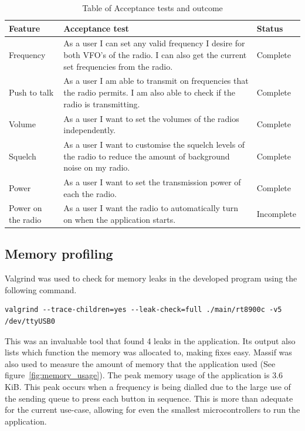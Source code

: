 \begin{table}[]
\centering
\begin{tabular}{|p{}|p{}|l|}
\hline
Feature               & Acceptance test                                                                                                                          & Status     \\
\hline
\hline
Frequency             & As a user I can set any valid frequency I desire for both VFO's of the radio. I can also get the current set frequencies from the radio. & Complete   \\
\hline
Push to talk          & As a user I am able to transmit on frequencies that the radio permits. I am also able to check if the radio is transmitting.             & Complete   \\
\hline
Volume                & As a user I want to set the volumes of the radios independently.                                                                         & Complete   \\
\hline
Squelch               & As a user I want to customise the squelch levels of the radio to reduce the amount of background noise on my radio.                      & Complete   \\
\hline
Power                 & As a user I want to set the transmission power of each the radio.                                                                        & Complete   \\
\hline
Power on the radio & As a user I want the radio to automatically turn on when the application starts.                                                          & Incomplete \\
\hline
\end{tabular}
\caption[Acceptance testing]{Table of Acceptance tests and outcome}
\label{table:acceptance_tests}
\end{table}

\subsection{Memory profiling}
Valgrind\cite{valgrind} was used to check for memory leaks in the developed program using the following command.

\begin{verbatim}
valgrind --trace-children=yes --leak-check=full ./main/rt8900c -v5 /dev/ttyUSB0 
\end{verbatim}

This was an invaluable tool that found 4 leaks in the application. Its output also lists which function the memory was allocated to, making fixes easy. Massif was also used to measure the amount of memory that the application used (See figure~\ref{fig:memory_usage}). The peak memory usage of the application is 3.6 KiB. This peak occurs when a frequency is being dialled due to the large use of the sending queue to press each button in sequence. This is more than adequate for the current use-case, allowing for even the smallest microcontrollers to run the application.


